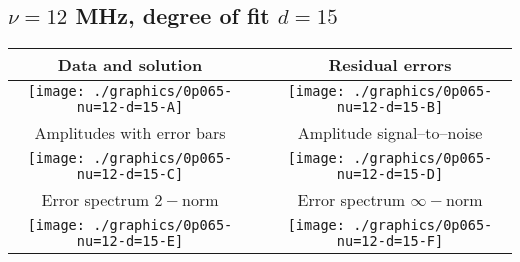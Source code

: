 

% 

\clearpage{}
\break{}

\subsection{$\nu = 12$ MHz, degree of fit $d = 15$}

\begin{table}[h]
    \begin{center}
        \begin{tabular}{ccc}
            Data and solution & \quad & Residual errors \\\hline
            \texttt{[image: ./graphics/0p065-nu=12-d=15-A]} &&
            \texttt{[image: ./graphics/0p065-nu=12-d=15-B]} \\[15pt]
            Amplitudes with error bars && Amplitude signal--to--noise \\\hline
            \texttt{[image: ./graphics/0p065-nu=12-d=15-C]} &&
            \texttt{[image: ./graphics/0p065-nu=12-d=15-D]} \\[15pt]
            Error spectrum $2-$norm && Error spectrum $\infty-$norm \\\hline
            \texttt{[image: ./graphics/0p065-nu=12-d=15-E]} &&
            \texttt{[image: ./graphics/0p065-nu=12-d=15-F]} \\[15pt]
        \end{tabular}
    \end{center}
\label{fig:elev=65, nu=12}
\end{table}



\endinput
